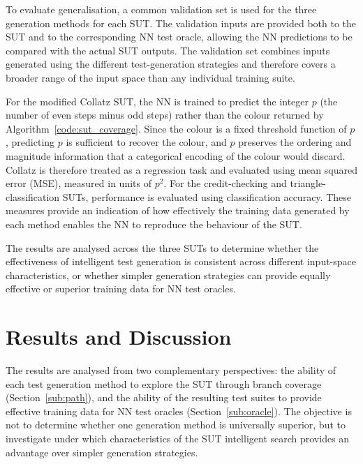 \documentclass[runningheads]{llncs}
\begin{document}
To evaluate generalisation, a common validation set is used for the three generation methods for each SUT. The validation inputs are provided both to the SUT and to the corresponding NN test oracle, allowing the NN predictions to be compared with the actual SUT outputs. The validation set combines inputs generated using the different test-generation strategies and therefore covers a broader range of the input space than any individual training suite.

For the modified Collatz SUT, the NN is trained to predict the integer $p$ (the number of even steps minus odd steps) rather than the colour returned by Algorithm~\ref{code:sut_coverage}. Since the colour is a fixed threshold function of $p$, predicting $p$ is sufficient to recover the colour, and $p$ preserves the ordering and magnitude information that a categorical encoding of the colour would discard. Collatz is therefore treated as a regression task and evaluated using mean squared error (MSE), measured in units of $p^2$. For the credit-checking and triangle-classification SUTs, performance is evaluated using classification accuracy. These measures provide an indication of how effectively the training data generated by each method enables the NN to reproduce the behaviour of the SUT.

The results are analysed across the three SUTs to determine whether the effectiveness of intelligent test generation is consistent across different input-space characteristics, or whether simpler generation strategies can provide equally effective or superior training data for NN test oracles.


\section{Results and Discussion} \label{sec:disc}
The results are analysed from two complementary perspectives: the ability of each test generation method to explore the SUT through branch coverage (Section~\ref{sub:path}), and the ability of the resulting test suites to provide effective training data for NN test oracles (Section~\ref{sub:oracle}). The objective is not to determine whether one generation method is universally superior, but to investigate under which characteristics of the SUT intelligent search provides an advantage over simpler generation strategies.

\end{document}
